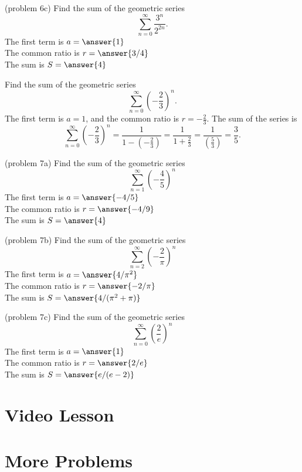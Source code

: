 \documentclass{ximera}
\begin{document}
\begin{problem}(problem 6c)
Find the sum of the geometric series 
\[
\sum_{n=0}^\infty \frac{3^n}{2^{2n}}.
\]
The first term is $a = \answer{1}$\\
The common ratio is $r = \answer{3/4}$\\
The sum is $S= \answer{4}$

\end{problem}



\begin{example}[example 7]
Find the sum of the geometric series 
\[
\sum_{n=0}^\infty \left(-\frac23\right)^n.
\]
The first term is $a = 1$, and the common ratio is $r = -\frac23$. The sum of the series is
\[
\sum_{n=0}^\infty \left(-\frac23\right)^n = \frac{1}{1-\left(-\frac23\right)} = \frac{1}{1 + \frac23} = \frac{1}{\left(\frac53\right)} = \frac35.
\]
\end{example}

\begin{problem}(problem 7a)
Find the sum of the geometric series 
\[
\sum_{n=1}^\infty \left(-\frac45\right)^n
\]
The first term is $a = \answer{-4/5}$\\
The common ratio is $r = \answer{-4/9}$\\
The sum is $S= \answer{4}$

\end{problem}


\begin{problem}(problem 7b)
Find the sum of the geometric series 
\[
\sum_{n=2}^\infty \left(-\frac{2}{\pi}\right)^n
\]
The first term is $a = \answer{4/\pi^2}$\\
The common ratio is $r = \answer{-2/\pi}$\\
The sum is $S= \answer{4/(\pi^2 + \pi)}$

\end{problem}

\begin{problem}(problem 7c)
Find the sum of the geometric series 
\[
\sum_{n=0}^\infty \left(\frac{2}{e}\right)^n
\]
The first term is $a = \answer{1}$\\
The common ratio is $r = \answer{2/e}$\\
The sum is $S= \answer{e/(e-2)}$

\end{problem}

\section{Video Lesson}


\begin{center}
\begin{foldable}
\end{foldable}
\end{center}


\section{More Problems}
\end{document}
